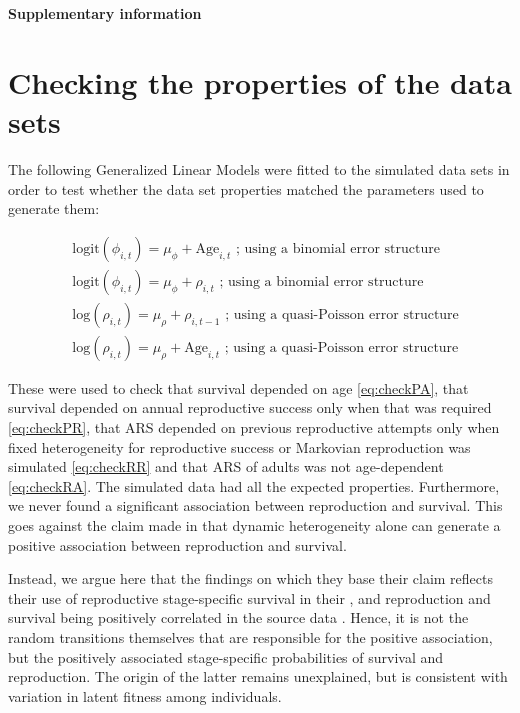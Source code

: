 \printbibliography[heading=subbibliography]

\newpage
\textbf{\LARGE{Supplementary information}}

\section{Checking the properties of the data sets}\label{ap:chpro}
The following Generalized Linear Models were fitted to the simulated data sets in order to test whether the data set properties matched the parameters used to generate them:

\begin{subequations}\label{eq:check}
\begin{align}
&\mathrm{logit}(\phi_{i,t})=\mu_{\phi}+\mathrm{Age}_{i,t}\label{eq:checkPA}\text{ ; using a binomial error structure}\\
&\mathrm{logit}(\phi_{i,t})=\mu_{\phi}+\rho_{i,t}\label{eq:checkPR}\text{ ; using a binomial error structure}\\
&\mathrm{log}(\rho_{i,t}) =\mu_{\rho}+ \rho_{i,t-1}\label{eq:checkRR}\text{ ; using a quasi-Poisson error structure}\\
&\mathrm{log}(\rho_{i,t}) =\mu_{\rho}+ \mathrm{Age}_{i,t}\label{eq:checkRA}\text{ ; using a quasi-Poisson error structure}
\end{align}
\end{subequations}

These were used to check that survival depended on age \eqref{eq:checkPA}, that survival depended on annual reproductive success only when that was required \eqref{eq:checkPR}, that ARS depended on previous reproductive attempts only when fixed heterogeneity for reproductive success or Markovian reproduction was simulated \eqref{eq:checkRR} and that ARS of adults was not age-dependent \eqref{eq:checkRA}. The simulated data had all the expected properties. Furthermore, we never found a significant association between reproduction and survival. This goes against the claim made in \cite{Steiner2010} that dynamic heterogeneity alone can generate a positive association between reproduction and survival.

Instead, we argue here that the findings on which they base their claim reflects their use of reproductive stage-specific survival in their \NSM, and reproduction and survival being positively correlated in the source data \parencite{Cam2002}. Hence, it is not the random transitions themselves that are responsible for the positive association, but the positively associated stage-specific probabilities of survival and reproduction. The origin of the latter remains unexplained, but is consistent with variation in latent fitness among individuals.

